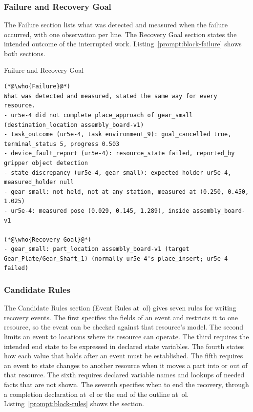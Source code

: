 \subsubsection{Failure and Recovery Goal}\label{sec:block-failure}

The Failure section lists what was detected and measured when the failure occurred, with one observation per line.
The Recovery Goal section states the intended outcome of the interrupted work.
Listing~\ref{prompt:block-failure} shows both sections.

\begin{recbox}{Failure and Recovery Goal}
\begin{lstlisting}
(*@\who{Failure}@*)
What was detected and measured, stated the same way for every resource.
- ur5e-4 did not complete place_approach of gear_small (destination_location assembly_board-v1)
- task_outcome (ur5e-4, task environment_9): goal_cancelled true, terminal_status 5, progress 0.503
- device_fault_report (ur5e-4): resource_state failed, reported_by gripper object detection
- state_discrepancy (ur5e-4, gear_small): expected_holder ur5e-4, measured_holder null
- gear_small: not held, not at any station, measured at (0.250, 0.450, 1.025)
- ur5e-4: measured pose (0.029, 0.145, 1.289), inside assembly_board-v1

(*@\who{Recovery Goal}@*)
- gear_small: part_location assembly_board-v1 (target Gear_Plate/Gear_Shaft_1) (normally ur5e-4's place_insert; ur5e-4 failed)
\end{lstlisting}
\end{recbox}

\subsubsection{Candidate Rules}\label{sec:block-rules}

The Candidate Rules section (Event Rules at~\gls{ol}) gives seven rules for writing recovery events. The first specifies
the fields of an event and restricts it to one resource, so the event can be checked against that
resource's model. The second limits an event to locations where its resource can operate. The
third requires the intended end state to be expressed in declared state variables. The fourth
states how each value that holds after an event must be established. The fifth requires an event
to state changes to another resource when it moves a part into or out of that resource. The sixth
requires declared variable names and lookups of needed facts that are not shown. The seventh
specifies when to end the recovery, through a completion declaration at~\gls{el} or the end of the outline at~\gls{ol}.
Listing~\ref{prompt:block-rules} shows the section.

